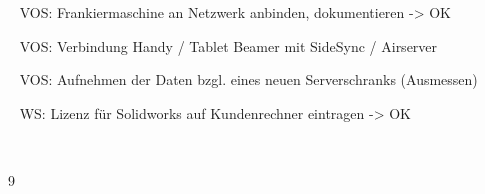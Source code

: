 {{	\textbullet~ VOS: Frankiermaschine an Netzwerk anbinden, dokumentieren -> OK\par
	\textbullet~ VOS: Verbindung Handy / Tablet Beamer mit SideSync / Airserver\par
	\textbullet~ VOS: Aufnehmen der Daten bzgl. eines neuen Serverschranks (Ausmessen)\par
	\textbullet~ WS: Lizenz für Solidworks auf Kundenrechner eintragen -> OK\par
	\textbullet~ 
	}{}{9}
}{}
\Unterschrift
\newpage
